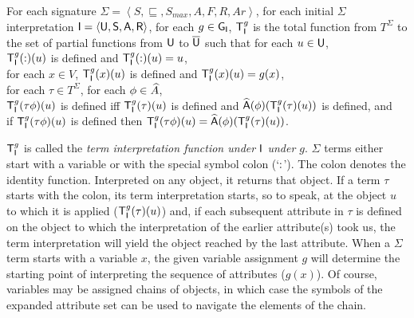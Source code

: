 \documentclass[output=paper
 	        ,biblatex
                ,babelshorthands
                ,newtxmath
                ,draftmode
                ,colorlinks, citecolor=brown
]{langscibook}
\begin{document}
{\begin{mydef}
For each signature $\Sigma=\left<S,\sqsubseteq,S_{max},A,F,R,Ar\right>$,
for each initial $\Sigma$ interpretation $\mathsf{I}=\langle\mathsf{U},\mathsf{S},\mathsf{A},\mathsf{R}\rangle$,
for each $g\in\mathsf{G}_{\mathsf{I}}$,
$\mathsf{T}^{g}_{\mathsf{I}}$ is the total function from $T^{\Sigma}$ to the
set of partial functions from $\mathsf{U}$ to $\overline{\mathsf{U}}$ such that
for each $u\in\mathsf{U}$,\\
\hspace*{.5cm} $\mathsf{T}^{g}_{\mathsf{I}}(\operatorname{:})(u)$ is defined and
$\mathsf{T}^{g}_{\mathsf{I}}(\operatorname{:})(u)=u$,\\
\hspace*{.5cm}for each $x\in V$, $\mathsf{T}^{g}_{\mathsf{I}}(x)(u)$ is defined and
$\mathsf{T}^{g}_{\mathsf{I}}(x)(u)=g(x)$,\\
\hspace*{.5cm}for each $\tau\in T^{\Sigma}$, for each $\phi\in\widehat{A}$,\\
\hspace*{1cm}$\mathsf{T}^{g}_{\mathsf{I}}(\tau\phi)(u)$ is defined %
             iff $\mathsf{T}^{g}_{\mathsf{I}}(\tau)(u)$ is defined and 
             $\widehat{\mathsf{A}}(\phi)(\mathsf{T}^{g}_{\mathsf{I}}(\tau)(u))$ is defined, and\\
\hspace*{1cm}if $\mathsf{T}^{g}_{\mathsf{I}}(\tau\phi)(u)$ is defined then
             $\mathsf{T}^{g}_{\mathsf{I}}(\tau\phi)(u)=\widehat{\mathsf{A}}(\phi)(\mathsf{T}^{g}_{\mathsf{I}}(\tau)(u))$.
\end{mydef}
$\mathsf{T}^{g}_{\mathsf{I}}$ is called the \emph{term interpretation function
  under $\mathsf{I}$ under $g$}. $\Sigma$ terms either start with a
variable or with the special symbol colon (`$\operatorname{:}$'). The colon
denotes the identity function. Interpreted on any object, it returns
that object.  If a term $\tau$ starts with the colon, its term
interpretation starts, so to speak, at the object $u$ to which it is
applied ($\mathsf{T}^{g}_{\mathsf{I}}(\tau)(u)$) and, if each subsequent
attribute in $\tau$ is defined on the object to which the
interpretation of the earlier attribute(s) took us, the term
interpretation will yield the object reached by the last
attribute. When a $\Sigma$ term starts with a variable $x$, the given
variable assignment $g$ will determine the starting point of
interpreting the sequence of attributes ($g(x)$).  Of course,
variables may be assigned chains of objects, in which case the symbols
of the expanded attribute set can be used to navigate the elements of
the chain.

}
\end{document}
